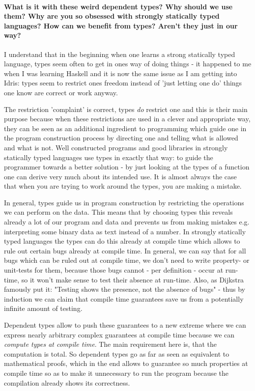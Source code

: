 \paragraph{What is it with these weird dependent types? Why should we use them? Why are you so obsessed with strongly statically typed languages? How can we benefit from types? Aren't they just in our way?}
I understand that in the beginning when one learns a strong statically typed language, types seem often to get in ones way of doing things - it happened to me when I was learning Haskell and it is now the same issue as I am getting into Idris: types seem to restrict ones freedom instead of 'just letting one do' things one know are correct or work anyway.

The restriction 'complaint' is correct, types \textit{do} restrict one and this is their main purpose because when these restrictions are used in a clever and appropriate way, they can be seen as an additional ingredient to programming which guide one in the program construction process by directing one and telling what is allowed and what is not. Well constructed programs and good libraries in strongly statically typed languages use types in exactly that way: to guide the programmer towards a better solution - by just looking at the types of a function one can derive very much about its intended use. It is almost always the case that when you are trying to work around the types, you are making a mistake.

In general, types guide us in program construction by restricting the operations we can perform on the data. This means that by choosing types this reveals already a lot of our program and data and prevents us from making mistakes e.g. interpreting some binary data as text instead of a number. In strongly statically typed languages the types can do this already at compile time which allows to rule out certain bugs already at compile time. In general, we can say that for all bugs which can be ruled out at compile time, we don't need to write property- or unit-tests for them, because those bugs cannot - per definition - occur at run-time, so it won't make sense to test their absence at run-time. Also, as Dijkstra famously put it: "Testing shows the presence, not the absence of bugs" - thus by induction we can claim that compile time guarantees save us from a potentially infinite amount of testing.

Dependent types allow to push these guarantees to a new extreme where we can express nearly arbitrary complex guarantees at compile time because we can \textit{compute types at compile time}. The main requirement here is, that the computation is total. So dependent types go as far as seen as equivalent to mathematical proofs, which in the end allows to guarantee so much properties at compile time so as to make it unnecessary to run the program because the compilation already shows its correctness.


